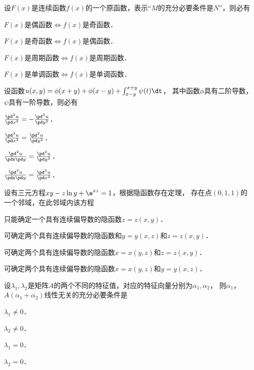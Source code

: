 \documentclass[plain,noanswer,medmath]{../../template/jnuexam}
\begin{document}
\begin{problem}
设$F(x)$是连续函数$f(x)$的一个原函数，表示“$M$的充分必要条件是$N$”，则必有\pickout{}
\begin{abcd}
\item $F(x)$是偶函数$\Leftrightarrow$$f(x)$是奇函数．
\item $F(x)$是奇函数$\Leftrightarrow$$f(x)$是偶函数．
\item $F(x)$是周期函数$\Leftrightarrow$$f(x)$是周期函数．
\item $F(x)$是单调函数$\Leftrightarrow$$f(x)$是单调函数．
\end{abcd}
\end{problem}


\begin{problem}
设函数$u(x,y) = \phi(x + y) + \phi(x - y) + \int_{x - y}^{x + y} \psi(t)\dt$，
其中函数$\phi$具有二阶导数，$\psi$具有一阶导数，则必有\pickout{}
\begin{abcd}
\item $\frac{\pd^2 u}{\pd x^2} = - \frac{\pd^2 u}{\pd y^2}$．
\item $\frac{\pd^2 u}{\pd x^2} = \frac{\pd^2 u}{\pd y^2}$．
\item $\frac{\pd^2 u}{\pdx\pd y} = \frac{\pd^2 u}{\pd y^2}$．
\item $\frac{\pd^2 u}{\pdx\pd y} = \frac{\pd^2 u}{\pd x^2}$．
\end{abcd}
\end{problem}


\begin{problem}
设有三元方程$xy - z\ln y + \e^{xz} = 1$，根据隐函数存在定理，
存在点$(0,1,1)$的一个邻域，在此邻域内该方程\pickout{}
\begin{abcd}
\item 只能确定一个具有连续偏导数的隐函数$z = z(x,y)$．
\item 可确定两个具有连续偏导数的隐函数和$y = y(x,z)$和$z = z(x,y)$．
\item 可确定两个具有连续偏导数的隐函数$x = x(y,z)$和$z = z(x,y)$．
\item 可确定两个具有连续偏导数的隐函数$x = x(y,z)$和$y = y(x,z)$．
\end{abcd}
\end{problem}


\begin{problem}
设$\lambda_1,\lambda_2$是矩阵$A$的两个不同的特征值，对应的特征向量分别为$\alpha_1,\alpha_2$，
则$\alpha_1$，$A(\alpha_1 + \alpha_2)$线性无关的充分必要条件是\pickout{}
\begin{abcd}
\item $\lambda_1 \ne 0$．
\item $\lambda_2 \ne 0$．
\item $\lambda_1 = 0$．
\item $\lambda_2 = 0$．
\end{abcd}
\end{problem}
\end{document}
